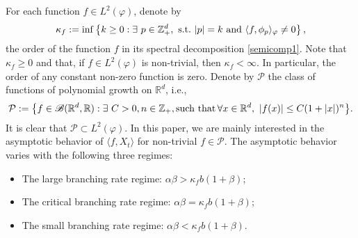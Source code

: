\documentclass[12pt,a4paper]{amsart}
\theoremstyle{plain}
\theoremstyle{definition}
\numberwithin{equation}{section}
\begin{document}
    For each function $f\in L^2(\varphi)$, denote by
\begin{equation}
    \kappa_f
    :=\inf \left \{k\geq 0: \exists ~ p\in \mathbb Z_+^d ,{\rm ~s.t.~}|p|=k {\rm ~and~}  \langle f, \phi_p \rangle_{\varphi}\neq 0\right \},
\end{equation}
    the order of the function $f$ in its spectral decomposition \eqref{semicomp1}.
    Note that $ \kappa_f\geq 0$ and that, if $f\in L^2(\varphi)$ is non-trivial, then $\kappa_f<\infty$.
    In particular, the order of any constant non-zero function is zero.
    Denote by $\mathcal P$ the class of functions of polynomial growth on $\mathbb R^d$, i.e.,
\begin{equation}
\label{eq: polynomial growth function}
    \mathcal{P}
    :=\big \{f\in \mathscr B(\mathbb R^d, \mathbb R):\exists~ C>0, n \in \mathbb Z_+, {\rm such  \, \, that \, } \forall x\in \mathbb R^d,~ |f(x)|\leq C(1+|x|)^n\big\}.
\end{equation}
    It is clear that $\mathcal{P} \subset L^2(\varphi)$.
    In this paper, we are mainly interested in the asymptotic behavior of $\langle f, X_t\rangle$ 
    for non-trivial $f\in \mathcal P$.
    The asymptotic behavior varies with the following three regimes:
    \begin{itemize}
\item
    The large branching rate regime: $\alpha\beta>\kappa_fb(1+\beta)$;
\item
    The critical branching rate regime: $\alpha\beta=\kappa_fb(1+\beta)$;
\item
    The small branching rate regime: $\alpha\beta<\kappa_fb(1+\beta)$.
\end{itemize}
\end{document}
